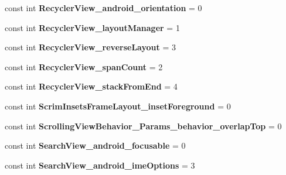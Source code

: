 \begin{DoxyCompactItemize}
const int {\bfseries Recycler\+View\+\_\+android\+\_\+orientation} = 0
\item 
\mbox{\label{class_pinned_app_1_1_droid_1_1_resource_1_1_styleable_abf85bd8ef67358ed1daf65c240254099}} 
const int {\bfseries Recycler\+View\+\_\+layout\+Manager} = 1
\item 
\mbox{\label{class_pinned_app_1_1_droid_1_1_resource_1_1_styleable_ac4ade20a88ab5c733ff5d2857653feff}} 
const int {\bfseries Recycler\+View\+\_\+reverse\+Layout} = 3
\item 
\mbox{\label{class_pinned_app_1_1_droid_1_1_resource_1_1_styleable_a5e185db1daae67a4410a735208e24091}} 
const int {\bfseries Recycler\+View\+\_\+span\+Count} = 2
\item 
\mbox{\label{class_pinned_app_1_1_droid_1_1_resource_1_1_styleable_adc476c21fb84075356950e9f74a6ba15}} 
const int {\bfseries Recycler\+View\+\_\+stack\+From\+End} = 4
\item 
\mbox{\label{class_pinned_app_1_1_droid_1_1_resource_1_1_styleable_a55d24b6d69a32d9834e551a48dabee31}} 
const int {\bfseries Scrim\+Insets\+Frame\+Layout\+\_\+inset\+Foreground} = 0
\item 
\mbox{\label{class_pinned_app_1_1_droid_1_1_resource_1_1_styleable_a4ac315f60ba64bfab748b506df3a75f2}} 
const int {\bfseries Scrolling\+View\+Behavior\+\_\+\+Params\+\_\+behavior\+\_\+overlap\+Top} = 0
\item 
\mbox{\label{class_pinned_app_1_1_droid_1_1_resource_1_1_styleable_ad615fd7ae15d322e90da1da6011061bf}} 
const int {\bfseries Search\+View\+\_\+android\+\_\+focusable} = 0
\item 
\mbox{\label{class_pinned_app_1_1_droid_1_1_resource_1_1_styleable_aa6d4b15c9c7bf72728e61f142e095d79}} 
const int {\bfseries Search\+View\+\_\+android\+\_\+ime\+Options} = 3

\end{DoxyCompactItemize}
